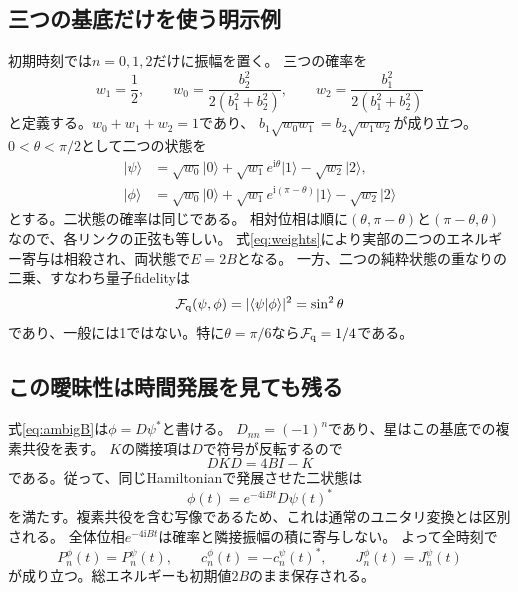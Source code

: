 \documentclass[a4paper,11pt]{ltjsarticle}
\numberwithin{equation}{section}
\newcommand{\ket}[1]{\lvert #1\rangle}
\newcommand{\ii}{\mathrm i}
\begin{document}
\subsection{三つの基底だけを使う明示例}
初期時刻では$n=0,1,2$だけに振幅を置く。
三つの確率を
\begin{equation}
 w_1=\frac12,\qquad
 w_0=\frac{b_2^2}{2(b_1^2+b_2^2)},\qquad
 w_2=\frac{b_1^2}{2(b_1^2+b_2^2)}
 \label{eq:weights}
\end{equation}
と定義する。$w_0+w_1+w_2=1$であり、
$b_1\sqrt{w_0w_1}=b_2\sqrt{w_1w_2}$が成り立つ。
$0<\theta<\pi/2$として二つの状態を
\begin{align}
 \ket{\psi}&=\sqrt{w_0}\ket0+\sqrt{w_1}e^{\ii\theta}\ket1-\sqrt{w_2}\ket2,
 \label{eq:ambigA}\\
 \ket{\phi}&=\sqrt{w_0}\ket0+\sqrt{w_1}e^{\ii(\pi-\theta)}\ket1-\sqrt{w_2}\ket2
 \label{eq:ambigB}
\end{align}
とする。二状態の確率は同じである。
相対位相は順に$(\theta,\pi-\theta)$と$(\pi-\theta,\theta)$なので、各リンクの正弦も等しい。
式\eqref{eq:weights}により実部の二つのエネルギー寄与は相殺され、両状態で$E=2B$となる。
一方、二つの純粋状態の重なりの二乗、すなわち量子fidelityは
\begin{equation}
 \mathcal F_{\rm q}(\psi,\phi)=|\langle\psi|\phi\rangle|^2=\sin^2\theta
 \label{eq:ambigF}
\end{equation}
であり、一般には1ではない。特に$\theta=\pi/6$なら$\mathcal F_{\rm q}=1/4$である。

\subsection{この曖昧性は時間発展を見ても残る}
式\eqref{eq:ambigB}は$\phi=D\psi^*$と書ける。
$D_{nn}=(-1)^n$であり、星はこの基底での複素共役を表す。
$K$の隣接項は$D$で符号が反転するので
\begin{equation}
 D K D=4B I-K
 \label{eq:DKD}
\end{equation}
である。従って、同じHamiltonianで発展させた二状態は
\begin{equation}
 \phi(t)=e^{-4\ii Bt}D\psi(t)^*
 \label{eq:antiunitary}
\end{equation}
を満たす。複素共役を含む写像であるため、これは通常のユニタリ変換とは区別される。
全体位相$e^{-4\ii Bt}$は確率と隣接振幅の積に寄与しない。
よって全時刻で
\begin{equation}
 P_n^\phi(t)=P_n^\psi(t),\qquad
 c_n^\phi(t)=-c_n^\psi(t)^*,\qquad
 J_n^\phi(t)=J_n^\psi(t)
 \label{eq:alltimes}
\end{equation}
が成り立つ。総エネルギーも初期値$2B$のまま保存される。
\end{document}
